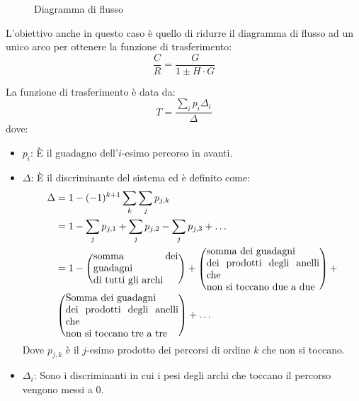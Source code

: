 \documentclass[a4paper]{article}
\begin{document}
\begin{enumerate}
\begin{figure}[H]
      \caption{Diagramma di flusso}
    \end{figure}
\end{enumerate}
L'obiettivo anche in questo caso è quello di ridurre il diagramma di flusso ad un unico
arco per ottenere la funzione di trasferimento:
\[
\frac{C}{R} = \frac{G}{1 \pm H \cdot G}
\] 

\begin{definition}
  La funzione di trasferimento è data da:
  \[
  T = \frac{\sum_i p_i \Delta_i}{\Delta}
  \] 
  dove:
  \begin{itemize}
    \item \( p_i \): È il guadagno dell'\( i \)-esimo percorso in avanti.
    \item \( \Delta \): È il discriminante del sistema ed è definito come:
      \[
        \begin{aligned}
          \Delta &= 1 - (-1)^{k+1} \sum_k \sum_j p_{j,k}\\
                 &= 1 - \sum_j p_{j,1} + \sum_j p_{j,2} - \sum_j p_{j,3} + \ldots\\
                 &= 1 - \left( \parbox{3cm}{somma dei guadagni\\di tutti gli archi} \right) +
                 \left( \parbox{4cm}{somma dei guadagni\\dei prodotti degli anelli che\\
                 non si toccano due a due} \right) +\\
                 &\left( \parbox{4cm}{Somma dei guadagni\\dei prodotti degli anelli che\\non
                 si toccano tre a tre} \right) + \ldots
        \end{aligned}
      \]
      Dove \( p_{j,k} \) è il \( j \)-esimo prodotto dei percorsi di ordine \( k \) che
      non si toccano.
    \item \( \Delta_i \): Sono i discriminanti in cui i pesi degli archi che toccano
      il percorso vengono messi a \( 0 \).
  \end{itemize}
\end{definition}
\end{document}
